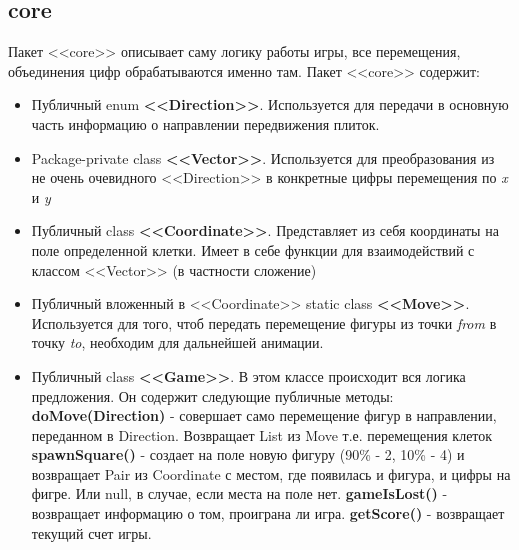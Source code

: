 \subsection{core}
Пакет <<core>> описывает саму логику работы игры, все перемещения, объединения цифр обрабатываются именно там. Пакет <<core>> содержит:
\begin{itemize}
\item Публичный enum \textbf{<<Direction>>}. Используется для передачи в основную часть информацию о направлении передвижения плиток.
\item Package-private class \textbf{<<Vector>>}. Используется для преобразования из не очень очевидного <<Direction>> в конкретные цифры перемещения по \textit{x} и \textit{y}
\item Публичный class \textbf{<<Coordinate>>}. Представляет из себя координаты на поле определенной клетки. Имеет в себе функции для взаимодействий с классом <<Vector>> (в частности сложение)
\item Публичный вложенный в <<Coordinate>> static class \textbf{<<Move>>}. Используется для того, чтоб передать перемещение фигуры из точки \textit{from} в точку \textit{to}, необходим для дальнейшей анимации.
\item Публичный class \textbf{<<Game>>}. В этом классе происходит вся логика предложения. Он содержит следующие публичные методы:
\subitem \textbf{doMove(Direction)} - совершает само перемещение фигур в направлении, переданном в Direction. Возвращает List из Move т.е. перемещения клеток 
\subitem \textbf{spawnSquare()} - создает на поле новую фигуру (90\% - 2, 10\% - 4) и возвращает Pair из Coordinate с местом, где появилась и фигура, и цифры на фигре. Или null, в случае, если места на поле нет.
\subitem \textbf{gameIsLost()} - возвращает информацию о том, проиграна ли игра.
\subitem \textbf{getScore()} - возвращает текущий счет игры.
\end{itemize}

